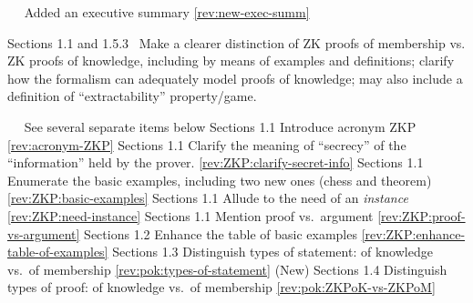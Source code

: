 \newcol {}
\newcol \contributors\ \NISTPECteam
				\Chan\ Added an executive summary
\newcol \ref{rev:new-exec-summ}
\rowendL
\myendIssue



Sections 1.1 and 1.5.3
\newcol \ccontext {}
				\propContrib\ Make a clearer distinction of ZK proofs of membership vs. ZK proofs of knowledge, including by means of examples and definitions; clarify how the formalism can adequately model proofs of knowledge; may also include a definition of ``extractability'' property/game.
				
\newcol {}
\newcol \contributors\ \NISTPECteam
				\Note\ See several separate items below
\newcol 
\rowendL
Sections 1.1
\newcol \newcol \newcol Introduce acronym ZKP
\newcol \ref{rev:acronym-ZKP}
\rowendL
Sections 1.1
\newcol \newcol \newcol Clarify the meaning of ``secrecy'' of the ``information'' held by the prover.
\newcol \ref{rev:ZKP:clarify-secret-info}
\rowendL
Sections 1.1
\newcol \newcol \newcol Enumerate the basic examples, including two new ones (chess and theorem)
\newcol \ref{rev:ZKP:basic-examples}
\rowendL
Sections 1.1
\newcol \newcol \newcol Allude to the need of an \emph{instance}
\newcol \ref{rev:ZKP:need-instance}
\rowendL
Sections 1.1
\newcol \newcol \newcol Mention proof vs.\ argument
\newcol \ref{rev:ZKP:proof-vs-argument}
\rowendL
Sections 1.2
\newcol \newcol \newcol Enhance the table of basic examples
\newcol \ref{rev:ZKP:enhance-table-of-examples}
\rowendL
Sections 1.3
\newcol \newcol \newcol Distinguish types of statement: of knowledge vs.\ of membership
\newcol \ref{rev:pok:types-of-statement}
\rowendL
(New) Sections 1.4
\newcol \newcol \newcol Distinguish types of proof: of knowledge vs.\ of membership
\newcol \ref{rev:pok:ZKPoK-vs-ZKPoM}
\rowendL
